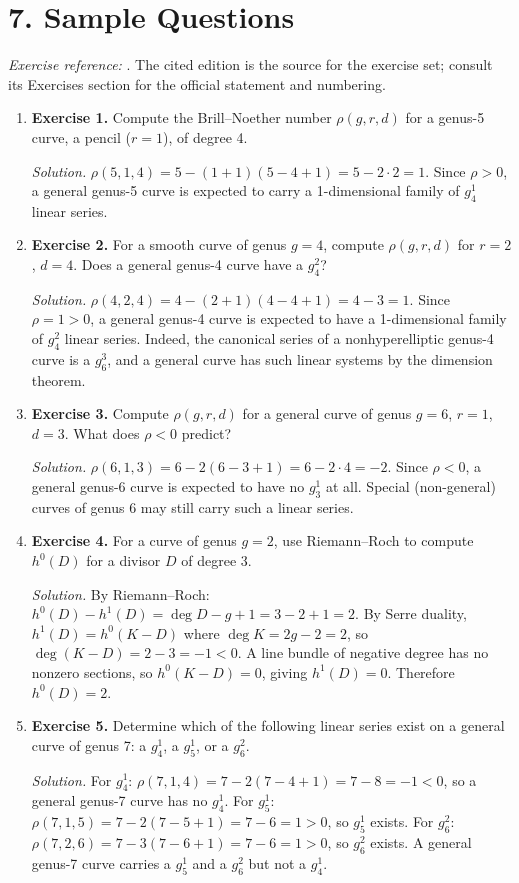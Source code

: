 \section*{7. Sample Questions}
\emph{Exercise reference:} \cite{brill_noether_theory_ref1}. The cited edition is the source for the exercise set; consult its Exercises section for the official statement and numbering.
\begin{enumerate}[leftmargin=*,itemsep=0.9em]

\item \textbf{Exercise 1.} Compute the Brill--Noether number $\rho(g,r,d)$ for a genus-5 curve, a pencil ($r=1$), of degree 4.

\emph{Solution.} $\rho(5,1,4)=5-(1+1)(5-4+1)=5-2\cdot 2=1$. Since $\rho>0$, a general genus-5 curve is expected to carry a 1-dimensional family of $g^1_4$ linear series.

\item \textbf{Exercise 2.} For a smooth curve of genus $g=4$, compute $\rho(g,r,d)$ for $r=2$, $d=4$. Does a general genus-4 curve have a $g^2_4$?

\emph{Solution.} $\rho(4,2,4)=4-(2+1)(4-4+1)=4-3=1$. Since $\rho=1>0$, a general genus-4 curve is expected to have a 1-dimensional family of $g^2_4$ linear series. Indeed, the canonical series of a nonhyperelliptic genus-4 curve is a $g^3_6$, and a general curve has such linear systems by the dimension theorem.

\item \textbf{Exercise 3.} Compute $\rho(g,r,d)$ for a general curve of genus $g=6$, $r=1$, $d=3$. What does $\rho<0$ predict?

\emph{Solution.} $\rho(6,1,3)=6-2(6-3+1)=6-2\cdot 4=-2$. Since $\rho<0$, a general genus-6 curve is expected to have no $g^1_3$ at all. Special (non-general) curves of genus 6 may still carry such a linear series.

\item \textbf{Exercise 4.} For a curve of genus $g=2$, use Riemann--Roch to compute $h^0(D)$ for a divisor $D$ of degree 3.

\emph{Solution.} By Riemann--Roch: $h^0(D)-h^1(D)=\deg D-g+1=3-2+1=2$. By Serre duality, $h^1(D)=h^0(K-D)$ where $\deg K=2g-2=2$, so $\deg(K-D)=2-3=-1<0$. A line bundle of negative degree has no nonzero sections, so $h^0(K-D)=0$, giving $h^1(D)=0$. Therefore $h^0(D)=2$.

\item \textbf{Exercise 5.} Determine which of the following linear series exist on a general curve of genus 7: a $g^1_4$, a $g^1_5$, or a $g^2_6$.

\emph{Solution.} For $g^1_4$: $\rho(7,1,4)=7-2(7-4+1)=7-8=-1<0$, so a general genus-7 curve has no $g^1_4$. For $g^1_5$: $\rho(7,1,5)=7-2(7-5+1)=7-6=1>0$, so $g^1_5$ exists. For $g^2_6$: $\rho(7,2,6)=7-3(7-6+1)=7-6=1>0$, so $g^2_6$ exists. A general genus-7 curve carries a $g^1_5$ and a $g^2_6$ but not a $g^1_4$.

\end{enumerate}
